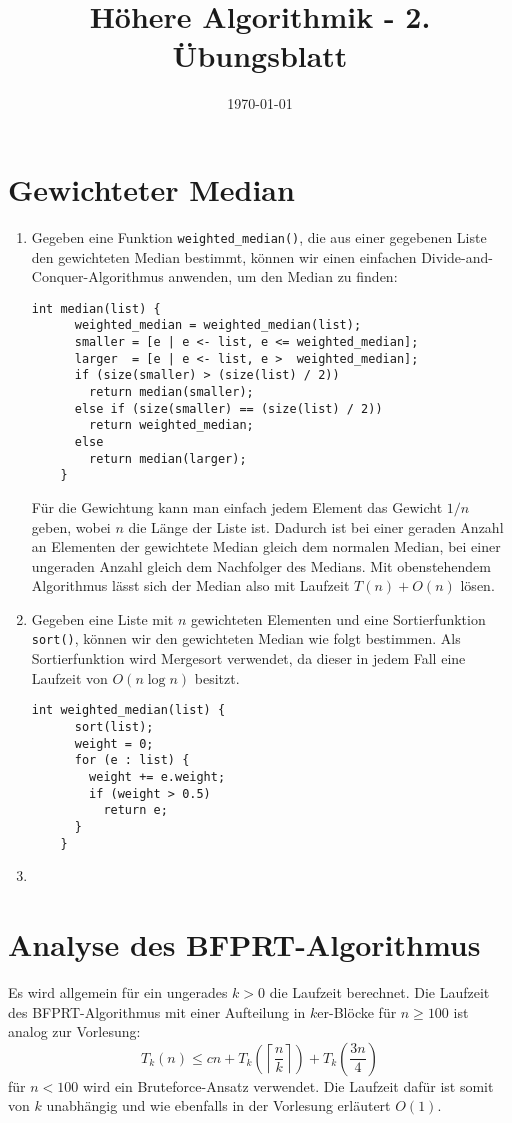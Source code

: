 \documentclass[a4paper,10pt]{scrartcl}
\title{H\"ohere Algorithmik - 2. \"Ubungsblatt}
\author{\Authors}
\date{\today}
\begin{document}
\maketitle

\section{Gewichteter Median}
\begin{enumerate}
\item	Gegeben eine Funktion \texttt{weighted\_median()}, die
	aus einer gegebenen Liste den gewichteten Median bestimmt,
	können wir einen einfachen Divide-and-Conquer-Algorithmus
	anwenden, um den Median zu finden:

	\begin{lstlisting}[numbers=none]
	int median(list) {
	  weighted_median = weighted_median(list);
	  smaller = [e | e <- list, e <= weighted_median];
	  larger  = [e | e <- list, e >  weighted_median];
	  if (size(smaller) > (size(list) / 2))
	    return median(smaller);
	  else if (size(smaller) == (size(list) / 2))
	    return weighted_median;
	  else
	    return median(larger);
	}
	\end{lstlisting}

	Für die Gewichtung kann man einfach jedem Element das Gewicht
	$1/n$ geben, wobei $n$ die Länge der Liste ist. Dadurch ist bei
	einer geraden Anzahl an Elementen der gewichtete Median gleich
	dem normalen Median, bei einer ungeraden Anzahl gleich dem
	Nachfolger des Medians. Mit obenstehendem Algorithmus lässt sich
	der Median also mit Laufzeit $T(n) + O(n)$ lösen.

\item	Gegeben eine Liste mit $n$ gewichteten Elementen und eine
	Sortierfunktion \texttt{sort()}, können wir den gewichteten
	Median wie folgt bestimmen. Als Sortierfunktion wird Mergesort
	verwendet, da dieser in jedem Fall eine Laufzeit von $O(n \log n)$ besitzt.

	\begin{lstlisting}[numbers=none]
	int weighted_median(list) {
	  sort(list);
	  weight = 0;
	  for (e : list) {
	    weight += e.weight;
	    if (weight > 0.5)
	      return e;
	  }
	}
	\end{lstlisting}

\item

\end{enumerate}

\section{Analyse des BFPRT-Algorithmus}
Es wird allgemein für ein ungerades $k > 0$ die Laufzeit berechnet.
Die Laufzeit des BFPRT-Algorithmus mit einer Aufteilung in $k$er-Blöcke für $n \geq 100$ ist analog zur Vorlesung:
\[T_k(n) \leq cn + T_k\left(\left\lceil\frac{n}{k}\right\rceil\right) + T_k\left(\frac{3n}{4}\right)\]
für $n < 100$ wird ein Bruteforce-Ansatz verwendet. Die Laufzeit dafür ist somit von $k$ unabhängig und wie ebenfalls in der Vorlesung erläutert $O(1)$.
\end{document}
